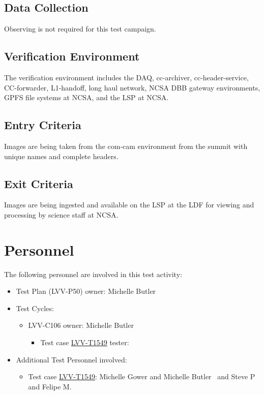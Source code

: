 \documentclass[DM,lsstdraft,STR,toc]{lsstdoc}
\begin{document}
\subsection{Data Collection}

  Observing is not required for this test campaign.

\subsection{Verification Environment}
\label{sect:hwconf}
  The verification environment includes the DAQ, cc-archiver,
cc-header-service, CC-forwarder, L1-handoff, long haul network, NCSA DBB
gateway environments, GPFS file systems at NCSA, and the LSP at NCSA. ~~


  \subsection{Entry Criteria}
  Images are being taken from the com-cam environment from the summit with
unique names and complete headers.~


  \subsection{Exit Criteria}
  Images are being ingested and available on the LSP at the LDF for
viewing and processing by science staff at NCSA.~~



\newpage
\section{Personnel}
\label{sect:personnel}

The following personnel are involved in this test activity:

\begin{itemize}
\item Test Plan (LVV-P50) owner: Michelle Butler
\item Test Cycles:
\begin{itemize}
  \item LVV-C106 owner: 
    Michelle Butler
  \begin{itemize}
    \item Test case \href{https://jira.lsstcorp.org/secure/Tests.jspa#/testCase/LVV-T1549}{LVV-T1549} tester: 
  \end{itemize}
\end{itemize}
\item Additional Test Personnel involved:
  \begin{itemize}
    \item Test case \href{https://jira.lsstcorp.org/secure/Tests.jspa#/testCase/LVV-T1549}{LVV-T1549}: Michelle Gower and Michelle Butler ~and Steve P and Felipe M.~

  \end{itemize}
\end{itemize}
\end{document}
